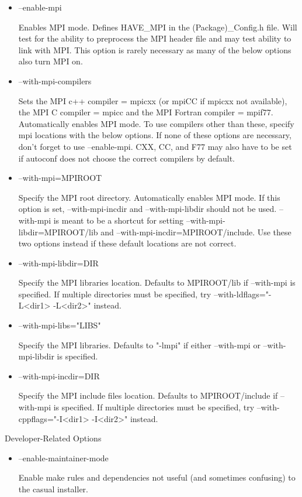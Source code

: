 \documentclass[12pt,relax]{SANDreport}
\begin{document}
\begin{itemize}
\item --enable-mpi 

Enables MPI mode. Defines HAVE\_MPI in the (Package)\_Config.h file. Will test 
for the ability to preprocess the MPI header file and may test ability to link 
with MPI.  This option is rarely necessary as many of the below options also 
turn MPI on.  

\item --with-mpi-compilers

Sets the MPI c++ compiler = mpicxx (or mpiCC if mpicxx not available), 
the MPI C compiler = mpicc and the MPI Fortran compiler = mpif77.  
Automatically enables MPI mode.  To use compilers other than these, 
specify mpi locations with the below options.  If none of these options 
are necessary, don't forget to use --enable-mpi.  CXX, CC, and F77 may also 
have to be set if autoconf does not choose the correct compilers by default.

\item --with-mpi=MPIROOT 

Specify the MPI root directory. Automatically enables MPI mode.  If this 
option is set, --with-mpi-incdir and --with-mpi-libdir should not be used.  
--with-mpi is meant to be a shortcut for setting --with-mpi-libdir=MPIROOT/lib 
and --with-mpi-incdir=MPIROOT/include.  Use these two options instead if 
these default locations are not correct.

\item --with-mpi-libdir=DIR 

Specify the MPI libraries location. Defaults to MPIROOT/lib if --with-mpi 
is specified. If multiple directories must be specified, try 
--with-ldflags="-L<dir1> -L<dir2>" instead. 

\item --with-mpi-libs="LIBS" 

Specify the MPI libraries. Defaults to "-lmpi" if either --with-mpi or 
--with-mpi-libdir is specified.

\item --with-mpi-incdir=DIR

Specify the MPI include files location. Defaults to MPIROOT/include if 
--with-mpi is specified. If multiple directories  must be specified, try 
--with-cppflags="-I<dir1> -I<dir2>" instead.
\end{itemize}

Developer-Related Options
\begin{itemize}
\item --enable-maintainer-mode 

Enable make rules and dependencies not useful (and sometimes confusing) to 
the casual installer.
\end{itemize}
\end{document}
